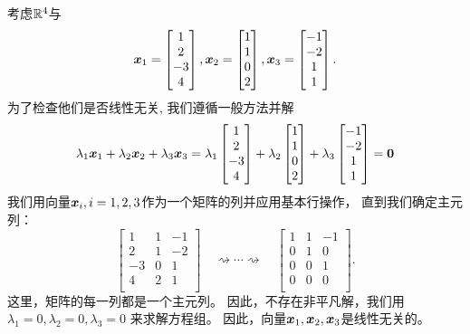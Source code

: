 \begin{example}
考虑$\mathbb{R}^4$与
\begin{equation}
    \boldsymbol{x}_1 =
    \begin{bmatrix}
        1 \\ 2 \\ -3 \\ 4
    \end{bmatrix},
    \boldsymbol{x}_2 =
    \begin{bmatrix}
        1 \\ 1 \\ 0 \\ 2
    \end{bmatrix},
    \boldsymbol{x}_3 =
    \begin{bmatrix}
        -1 \\ -2 \\ 1 \\ 1
    \end{bmatrix}.
\end{equation}
为了检查他们是否线性无关, 我们遵循一般方法并解
\begin{equation}
    \lambda_1\boldsymbol{x}_1 + \lambda_2\boldsymbol{x}_2 + \lambda_3\boldsymbol{x}_3 = \lambda_1
    \begin{bmatrix}
        1 \\ 2 \\ -3 \\ 4
    \end{bmatrix} +
    \lambda_2
    \begin{bmatrix}
        1 \\ 1 \\ 0 \\ 2
    \end{bmatrix} +
    \lambda_3
    \begin{bmatrix}
        -1 \\ -2 \\ 1 \\ 1
    \end{bmatrix}
    =\boldsymbol{0}
\end{equation}
我们用向量$\boldsymbol{x}_i,i = 1,2,3$作为一个矩阵的列并应用基本行操作， 直到我们确定主元列：
\begin{equation}
    \begin{bmatrix}
         1 &  1 & -1 \\
         2 &  1 & -2 \\
        -3 &  0 &  1 \\
         4 &  2 &  1 \\
    \end{bmatrix}
    \quad \rightsquigarrow \cdots \rightsquigarrow \quad
    \begin{bmatrix}
         1 &  1 & -1 \\
         0 &  1 &  0 \\
         0 &  0 &  1 \\
         0 &  0 &  0 \\
    \end{bmatrix}.
\end{equation}
这里，矩阵的每一列都是一个主元列。
因此，不存在非平凡解，我们用
$\lambda_1 = 0,\lambda_2 = 0,\lambda_3 = 0$ 来求解方程组。
因此，向量$\boldsymbol{x}_1,\boldsymbol{x}_2,\boldsymbol{x}_3$是线性无关的。
\end{example}

